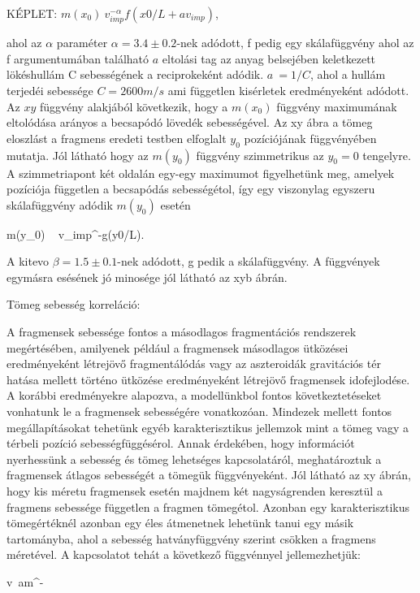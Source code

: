 KÉPLET: $m(x_0) ~ v_{imp}^{-\alpha}f(x0/L+av_{imp})$,

ahol az $\alpha$ paraméter $\alpha=3.4\pm0.2$-nek adódott, f pedig egy skálafüggvény ahol az f argumentumában található $a$ eltolási tag az anyag belsejében keletkezett 
lökéshullám C sebességének a reciprokeként adódik. $a~=1/C$, ahol a hullám terjedéi sebessége $C=2600m/s$ ami független kisérletek eredményeként adódott. Az $xy$ függvény
alakjából következik, hogy a $m(x_0)$ függvény maximumának eltolódása arányos a becsapódó lövedék sebességével. Az xy ábra a tömeg eloszlást a fragmens eredeti testben
elfoglalt $y_0$ pozíciójának függvényében mutatja. Jól látható hogy az $m(y_0)$ függvény szimmetrikus az $y_0=0$ tengelyre. A szimmetriapont két oldalán egy-egy maximumot
figyelhetünk meg, amelyek pozíciója független a becsapódás sebességétol, így egy viszonylag egyszeru skálafüggvény adódik $m(y_0)$ esetén

\beq
m(y_0) ~ v_{imp}^{-\beta}g(y0/L).
\eeq

A kitevo $\beta=1.5\pm 0.1$-nek adódott, g pedik a skálafüggvény. A függvények egymásra esésének jó minosége jól látható az xyb ábrán.

Tömeg sebesség korreláció:

A fragmensek sebessége fontos a másodlagos fragmentációs rendszerek megértésében, amilyenek például a fragmensek másodlagos ütközései eredményeként létrejövő fragmentálódás
vagy az aszteroidák gravitációs tér hatása mellett történo ütközése eredményeként létrejövő fragmensek idofejlodése. A korábbi eredményekre alapozva, a modellünkbol
fontos következtetéseket vonhatunk le a fragmensek sebességére vonatkozóan. Mindezek mellett fontos megállapításokat tehetünk egyéb karakterisztikus jellemzok mint a tömeg
vagy a térbeli pozíció sebességfüggésérol.
Annak érdekében, hogy információt nyerhessünk a sebesség és tömeg lehetséges kapcsolatáról, meghatároztuk a fragmensek átlagos sebességét a tömegük függvényeként.
Jól látható az xy ábrán, hogy kis méretu fragmensek esetén majdnem két nagyságrenden keresztül a fragmens sebessége független a fragmen tömegétol. Azonban egy karakterisztikus
tömegértéknél azonban egy éles átmenetnek lehetünk tanui egy másik tartományba, ahol a sebesség hatványfüggvény szerint csökken a fragmens méretével.
A kapcsolatot tehát a következő függvénnyel jellemezhetjük:

\beq
v~a\cdot m^{-\gamma}
\eeq

